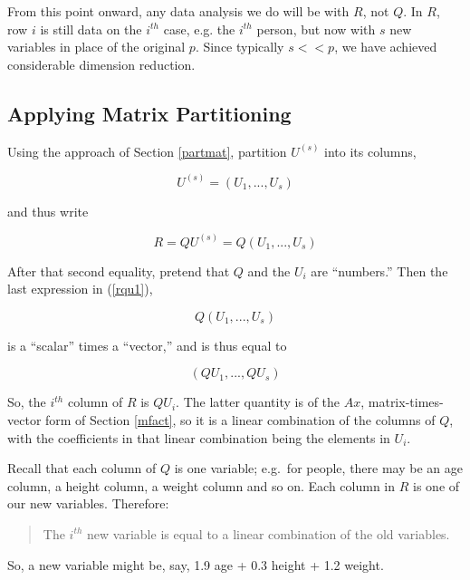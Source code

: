 From this point onward, any data analysis we do will be with $R$, not
$Q$.  In $R$, row $i$ is still data on the $i^{th}$ case, e.g. the
$i^{th}$ person, but now with $s$ new variables in place of the original
$p$.  Since typically $s << p$, we have achieved considerable dimension
reduction.

\subsection{Applying Matrix Partitioning}

Using the approach of Section \ref{partmat}, partition $U^{(s)}$ into
its columns,

\begin{equation}
U^{(s)} = (U_1,...,U_s) 
\end{equation}

and thus write

\begin{equation}
\label{rqu1}
R = Q U^{(s)} = Q (U_1,...,U_s)
\end{equation} 

After that second equality, pretend that $Q$ and the $U_i$ are
``numbers.''  Then the last expression in (\ref{rqu1}),

\begin{equation}
Q (U_1,...,U_s)
\end{equation}

is a ``scalar'' times a ``vector,'' and is thus equal to 

\begin{equation}
(QU_1,...,QU_s)
\end{equation}

So, the $i^{th}$ column of $R$ is $Q U_i$.  The latter quantity is of
the $Ax$, matrix-times-vector form of Section \ref{mfact}, so it is a
linear combination of the columns of $Q$, with the coefficients in that
linear combination being the elements in $U_i$.  

Recall that each column of $Q$ is one variable; e.g.\ for people, there
may be an age column, a height column, a weight column and so on.  Each
column in $R$ is one of our new variables.  Therefore:

\begin{quote}
The $i^{th}$ new variable is equal to a linear combination of the old
variables.
\end{quote}

So, a new variable might be, say, 1.9 age + 0.3 height + 1.2 weight.

